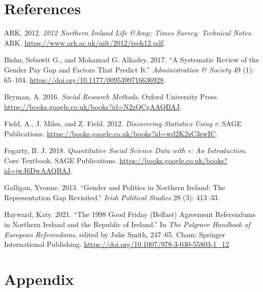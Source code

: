 \documentclass[
]{article}
\newlength{\cslhangindent}
\newlength{\cslentryspacingunit} %
\newenvironment{CSLReferences}[2] %
 {%
  \setlength{\parindent}{0pt}
  \ifodd #1
  \let\oldpar\par
  \def\par{\hangindent=\cslhangindent\oldpar}
  \fi
  \setlength{\parskip}{#2\cslentryspacingunit}
 }%
 {}
\begin{document}
\pagebreak

\hypertarget{references}{%
\section{References}\label{references}}

\hypertarget{refs}{}
\begin{CSLReferences}{1}{0}
\leavevmode{}%
ARK. 2012. \emph{2012 Northern Ireland Life \&Amp; Times Survey:
Technical Notes}. ARK. \url{https://www.ark.ac.uk/nilt/2012/tech12.pdf}.

\leavevmode{}%
Bishu, Sebawit G., and Mohamad G. Alkadry. 2017. {``A Systematic Review
of the Gender Pay Gap and Factors That Predict It.''}
\emph{Administration \& Society} 49 (1): 65--104.
\url{https://doi.org/10.1177/0095399716636928}.

\leavevmode{}%
Bryman, A. 2016. \emph{Social Research Methods}. Oxford University
Press. \url{https://books.google.co.uk/books?id=N2zQCgAAQBAJ}.

\leavevmode{}%
Field, A., J. Miles, and Z. Field. 2012. \emph{Discovering Statistics
Using r}. SAGE Publications.
\url{https://books.google.co.uk/books?id=wd2K2zC3swIC}.

\leavevmode{}%
Fogarty, B. J. 2018. \emph{Quantitative Social Science Data with r: An
Introduction}. Core Textbook. SAGE Publications.
\url{https://books.google.co.uk/books?id=jwJ6DwAAQBAJ}.

\leavevmode{}%
Galligan, Yvonne. 2013. {``Gender and Politics in Northern Ireland: The
Representation Gap Revisited.''} \emph{Irish Political Studies} 28 (3):
413--33.

\leavevmode{}%
Hayward, Katy. 2021. {``The 1998 Good Friday (Belfast) Agreement
Referendums in Northern Ireland and the Republic of Ireland.''} In
\emph{The Palgrave Handbook of European Referendums}, edited by Julie
Smith, 247--65. Cham: Springer International Publishing.
\url{https://doi.org/10.1007/978-3-030-55803-1_12}.

\end{CSLReferences}

\pagebreak

\hypertarget{appendix}{%
\section{Appendix}\label{appendix}}
\end{document}
